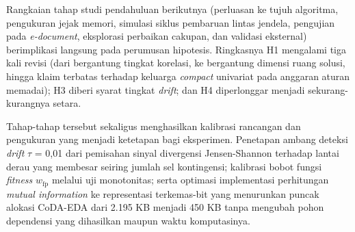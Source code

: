 Rangkaian tahap studi pendahuluan berikutnya (perluasan ke tujuh algoritma, pengukuran jejak memori, simulasi siklus pembaruan lintas jendela, pengujian pada \textit{e-document}, eksplorasi perbaikan cakupan, dan validasi eksternal) berimplikasi langsung pada perumusan hipotesis.
Ringkasnya H1 mengalami tiga kali revisi (dari bergantung tingkat korelasi, ke bergantung dimensi ruang solusi, hingga klaim terbatas terhadap keluarga \textit{compact} univariat pada anggaran aturan memadai); H3 diberi syarat tingkat \textit{drift}; dan H4 diperlonggar menjadi sekurang-kurangnya setara.

Tahap-tahap tersebut sekaligus menghasilkan kalibrasi rancangan dan pengukuran yang menjadi ketetapan bagi eksperimen.
Penetapan ambang deteksi \textit{drift} $\tau$ = 0,01 dari pemisahan sinyal divergensi Jensen-Shannon terhadap lantai derau yang membesar seiring jumlah sel kontingensi; kalibrasi bobot fungsi \textit{fitness} $w_\text{fp}$\label{first:symbol-wfp} melalui uji monotonitas; serta optimasi implementasi perhitungan \textit{mutual information} ke representasi terkemas-bit yang menurunkan puncak alokasi CoDA-EDA dari 2.195 KB menjadi 450 KB tanpa mengubah pohon dependensi yang dihasilkan maupun waktu komputasinya.